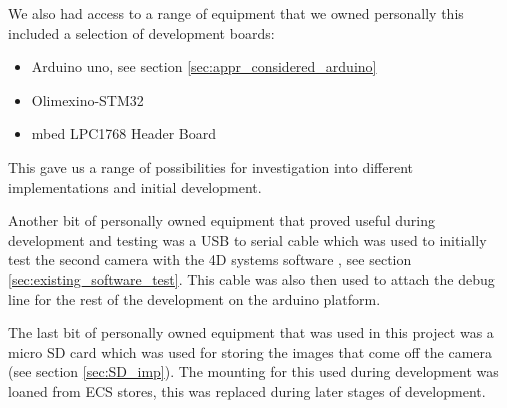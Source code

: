 We also had access to a range of equipment that we owned personally this included a selection of development boards:

\begin{itemize}
	\item Arduino uno, see section \ref{sec:appr_considered_arduino} \cite{arduino_serial_library}
	\item Olimexino-STM32 \cite{olimexino}
	\item mbed LPC1768 Header Board \cite{mbed}
\end{itemize}

This gave us a range of possibilities for investigation into different implementations and initial development.

Another bit of personally owned equipment that proved useful during development and testing was a USB to serial cable which was used to initially test the second camera with the 4D systems software \cite{ucam_test_software}, see section \ref{sec:existing_software_test}. This cable was also then used to attach the debug line for the rest of the development on the arduino platform.

The last bit of personally owned equipment that was used in this project was a micro SD card which was used for storing the images that come off the camera (see section \ref{sec:SD_imp}). The mounting for this used during development was loaned from ECS stores, this was replaced during later stages of development.
